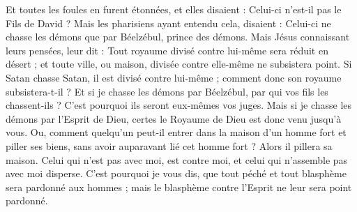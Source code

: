 \begin{multicols}{2}
{Et toutes les foules en furent étonnées, et elles disaient : Celui-ci n'est-il pas le Fils de David ?
Mais les pharisiens ayant entendu cela, disaient : Celui-ci ne chasse les démons que par Béelzébul, prince des démons.
Mais Jésus connaissant leurs pensées, leur dit : Tout royaume divisé contre lui-même sera réduit en désert ; et toute ville, ou maison, divisée contre elle-même ne subsistera point.
Si Satan chasse Satan, il est divisé contre lui-même ; comment donc son royaume subsistera-t-il ?
Et si je chasse les démons par Béelzébul, par qui vos fils les chassent-ils ? C’est pourquoi ils seront eux-mêmes vos juges.
Mais si je chasse les démons par l'Esprit de Dieu, certes le Royaume de Dieu est donc venu jusqu'à vous.
Ou, comment quelqu'un peut-il entrer dans la maison d'un homme fort et piller ses biens, sans avoir auparavant lié cet homme fort ? Alors il pillera sa maison.
Celui qui n'est pas avec moi, est contre moi, et celui qui n'assemble pas avec moi disperse.
C'est pourquoi je vous dis, que tout péché et tout blasphème sera pardonné aux hommes ; mais le blasphème contre l'Esprit ne leur sera point pardonné.
}
\end{multicols}
